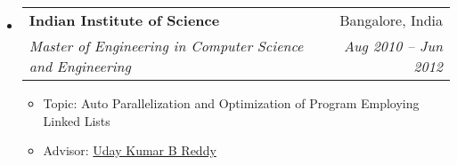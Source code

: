 \documentclass[letterpaper,11pt]{article}
\makeatletter
\newcommand{\resitem}[1]{\item #1 \vspace{-2pt}}
\newcommand{\ressubheading}[4]{
\begin{tabular*}{6.5in}{l@{\extracolsep{\fill}}r}
		\textbf{#1} & #2 \\
		\textit{#3} & \textit{#4} \\
\end{tabular*}\vspace{-6pt}}
\makeatother
\begin{document}
\begin{itemize}
		\item
			\ressubheading{{Indian Institute of Science}}{Bangalore, India}{{Master of Engineering in Computer Science and Engineering}}{Aug 2010 -- Jun 2012}
				{ \footnotesize
				\begin{itemize}
					\resitem {Topic: Auto Parallelization and Optimization of Program Employing Linked Lists}
					\resitem {Advisor: \href{https://www.csa.iisc.ac.in/~udayb}{Uday Kumar B Reddy}}
							

\end{itemize}}
\end{itemize}
\end{document}
